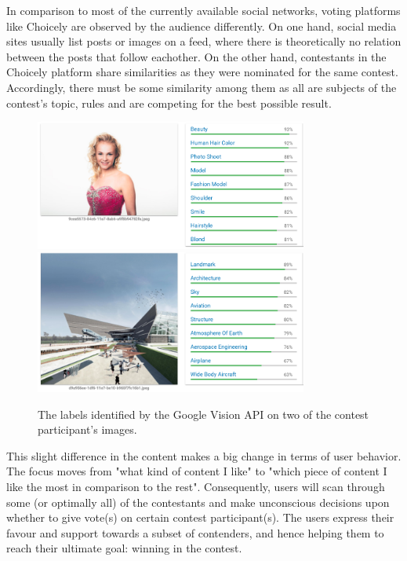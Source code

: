     In comparison to most of the currently available social networks, voting platforms like Choicely are observed by the audience differently. On one hand, social media sites usually list posts or images on a feed, where there is theoretically no relation between the posts that follow eachother. On the other hand, contestants in the Choicely platform share similarities as they were nominated for the same contest. Accordingly, there must be some similarity among them as all are subjects of the contest's topic, rules and are competing for the best possible result. 
    
    \begin{figure}[h] 
		\begin{center}
            \includegraphics[width=0.8\textwidth]{images/google_vision_labels.png}
            \includegraphics[width=0.8\textwidth]{images/google_vision_labels2.png}
			\caption{The labels identified by the Google Vision API on two of the contest participant's images.}
			\label{google_vision_labels}
		\end{center}
    \end{figure}

    This slight difference in the content makes a big change in terms of user behavior. The focus moves from "what kind of content I like" to "which piece of content I like the most in comparison to the rest". Consequently, users will scan through some (or optimally all) of the contestants and make unconscious decisions upon whether to give vote(s) on certain contest participant(s). The users express their favour and support towards a subset of contenders, and hence helping them to reach their ultimate goal: winning in the contest. 

